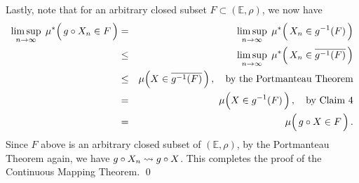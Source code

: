 \vskip 0.5cm
\noindent
Lastly, note that for an arbitrary closed subset $F \subset (\mathbb{E},\rho)$, we now have
\begin{eqnarray*}
\underset{n\rightarrow\infty}{\limsup}\;\, \mu^{*}\!\left(\,g \circ X_{n} \overset{{\color{white}.}}{\in} F\,\right)
&=&
	\underset{n\rightarrow\infty}{\limsup}\;\, \mu^{*}\!\left(\,X_{n} \overset{{\color{white}.}}{\in} g^{-1}(F)\,\right)
\\
&\leq&
	\underset{n\rightarrow\infty}{\limsup}\;\, \mu^{*}\!\left(\,X_{n} \overset{{\color{white}.}}{\in} \overline{g^{-1}(F)}\,\right)
\\
&\leq&
	\mu\!\left(X\overset{{\color{white}.}}{\in}\overline{g^{-1}(F)}\,\right),
	\quad\textnormal{by the Portmanteau Theorem}
\\
&=&
	\mu\!\left(X\overset{{\color{white}.}}{\in}g^{-1}(F)\,\right),
	\quad\textnormal{by Claim 4}
\\
&=&
	\mu\!\left(\,g \circ X\overset{{\color{white}.}}{\in}F\,\right).
\end{eqnarray*}
Since $F$ above is an arbitrary closed subset of $(\mathbb{E},\rho)$,
by the Portmanteau Theorem again, we have \;$g \circ X_{n} \rightsquigarrow g \circ X$.
This completes the proof of the Continuous Mapping Theorem.
\qed



\renewcommand{\theenumi}{\roman{enumi}}
\renewcommand{\labelenumi}{\textnormal{(\theenumi)}$\;\;$}

